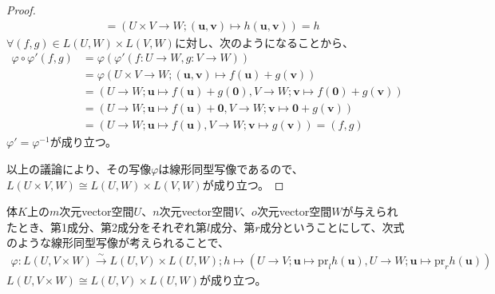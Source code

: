 \documentclass[dvipdfmx]{jsarticle}
\begin{document}
\begin{proof}
\begin{align*}
&= \left( U \times V \rightarrow W;\left( \mathbf{u},\mathbf{v} \right) \mapsto h\left( \mathbf{u},\mathbf{v} \right) \right) = h
\end{align*}
$\forall(f,g) \in L(U,W) \times L(V,W)$に対し、次のようになることから、
\begin{align*}
\varphi \circ \varphi'(f,g) &= \varphi\left( \varphi'(f:U \rightarrow W,g:V \rightarrow W) \right)\\
&= \varphi\left( U \times V \rightarrow W;\left( \mathbf{u},\mathbf{v} \right) \mapsto f\left( \mathbf{u} \right) + g\left( \mathbf{v} \right) \right)\\
&= \left( U \rightarrow W;\mathbf{u} \mapsto f\left( \mathbf{u} \right) + g\left( \mathbf{0} \right),V \rightarrow W;\mathbf{v} \mapsto f\left( \mathbf{0} \right) + g\left( \mathbf{v} \right) \right)\\
&= \left( U \rightarrow W;\mathbf{u} \mapsto f\left( \mathbf{u} \right) + \mathbf{0},V \rightarrow W;\mathbf{v} \mapsto \mathbf{0} + g\left( \mathbf{v} \right) \right)\\
&= \left( U \rightarrow W;\mathbf{u} \mapsto f\left( \mathbf{u} \right),V \rightarrow W;\mathbf{v} \mapsto g\left( \mathbf{v} \right) \right) = (f,g)
\end{align*}
$\varphi' = \varphi^{- 1}$が成り立つ。\par
以上の議論により、その写像$\varphi$は線形同型写像であるので、$L(U \times V,W) \cong L(U,W) \times L(V,W)$が成り立つ。
\end{proof}
\begin{thm}\label{2.4.9.9}
体$K$上の$m$次元vector空間$U$、$n$次元vector空間$V$、$o$次元vector空間$W$が与えられたとき、第1成分、第2成分をそれぞれ第$l$成分、第$r$成分ということにして、次式のような線形同型写像が考えられることで、
\begin{align*}
\varphi:L(U,V \times W)\overset{\sim}{\rightarrow}L(U,V) \times L(U,W);h \mapsto \left( U \rightarrow V;\mathbf{u} \mapsto \mathrm{pr}_{l}{h\left( \mathbf{u} \right)},U \rightarrow W;\mathbf{u} \mapsto \mathrm{pr}_{r}{h\left( \mathbf{u} \right)} \right)
\end{align*}
$L(U,V \times W) \cong L(U,V) \times L(U,W)$が成り立つ。
\end{thm}
\end{document}
